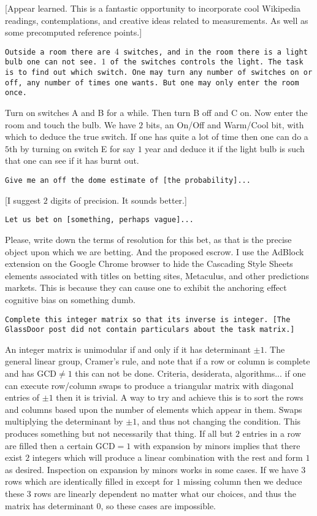 [Appear learned. This is a fantastic opportunity to incorporate cool Wikipedia readings, contemplations, and creative ideas related to measurements. As well as some precomputed reference points.]

\texttt{Outside a room there are $4$ switches, and in the room there is a light bulb one can not see. $1$ of the switches controls the light. The task is to find out which switch. One may turn any number of switches on or off, any number of times one wants. But one may only enter the room once.}

Turn on switches A and B for a while. Then turn B off and C on. Now enter the room and touch the bulb. We have $2$ bits, an On/Off and Warm/Cool bit, with which to deduce the true switch. If one has quite a lot of time then one can do a $5$th by turning on switch E for say $1$ year and deduce it if the light bulb is such that one can see if it has burnt out.

\texttt{Give me an off the dome estimate of [the probability]...}

[I suggest $2$ digits of precision. It sounds better.]

\texttt{Let us bet on [something, perhaps vague]...}

Please, write down the terms of resolution for this bet, as that is the precise object upon which we are betting. And the proposed escrow. I use the AdBlock extension on the Google Chrome browser to hide the Cascading Style Sheets elements associated with titles on betting sites, Metaculus, and other predictions markets. This is because they can cause one to exhibit the anchoring effect cognitive bias on something dumb.

\texttt{Complete this integer matrix so that its inverse is integer. [The GlassDoor post did not contain particulars about the task matrix.]}

An integer matrix is unimodular if and only if it has determinant $\pm 1$. The general linear group, Cramer's rule, and note that if a row or column is complete and has $\text{GCD} \neq 1$ this can not be done. Criteria, desiderata, algorithms... if one can execute row/column swaps to produce a triangular matrix with diagonal entries of $\pm 1$ then it is trivial. A way to try and achieve this is to sort the rows and columns based upon the number of elements which appear in them. Swaps multiplying the determinant by $\pm 1$, and thus not changing the condition. This produces something but not necessarily that thing. If all but $2$ entries in a row are filled then a certain $\text{GCD} = 1$ with expansion by minors implies that there exist $2$ integers which will produce a linear combination with the rest and form $1$ as desired. Inspection on expansion by minors works in some cases. If we have $3$ rows which are identically filled in except for $1$ missing column then we deduce these $3$ rows are linearly dependent no matter what our choices, and thus the matrix has determinant $0$, so these cases are impossible.

